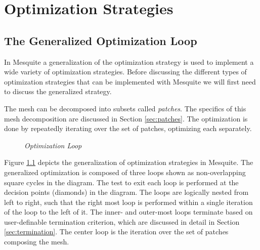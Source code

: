 \chapter{Optimization Strategies}

\section{The Generalized Optimization Loop}

In Mesquite a generalization of the optimization strategy is used to implement a wide variety of optimization strategies.  Before discussing the different types of optimization strategies that can be implemented with Mesquite we will first need to discuss the generalized strategy.

The mesh can be decomposed into subsets called {\em patches}.  The specifics of this mesh decomposition are discussed in Section \ref{sec:patches}.  The optimization is done by repeatedly iterating over the set of patches, optimizing each separately.

\begin{figure}[htb!]
\begin{center}
\noindent{}
\caption{\em Optimization Loop \label{fig:genoptloop}}
\end{center}
\end{figure}

Figure \ref{fig:genoptloop} depicts the generalization of optimization strategies in Mesquite.  The generalized optimization is composed of three loops shown as non-overlapping square cycles in the diagram.  The test to exit each loop is performed at the decision points (diamonds) in the diagram.  The loops are logically nested from left to right, such that the right most loop is performed within a single iteration of the loop to the left of it.  The inner- and outer-most loops terminate based on user-definable termination criterion, which are discussed in detail in Section \ref{sec:termination}.  The center loop is the iteration over the set of patches composing the mesh.

